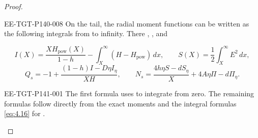\begin{proof}
\begin{EESegment}{EE-TGT-P140-008}
On the tail, the radial moment functions can be written as the following integrals from
 to infinity. There ,
, and
\end{EESegment}
\[
  I(X)=\frac{XH_{\mathrm{pow}}(X)}{1-h}-\int_X^\infty(H-H_{\mathrm{pow}})\,dx,
  \qquad
  S(X)=\frac12\int_X^\infty E^2\,dx,
\]
\[
  Q_s=-1+\frac{(1-h)I-D\eta I_\eta}{XH},
  \qquad
  N_s=\frac{4h\eta S-dS_\eta}{X}+4A\eta\Pi-d\Pi_\eta.
\]

%
\begin{EESegment}{EE-TGT-P141-001}
The first formula uses  to integrate
 from zero. The remaining formulas follow directly from the exact moments and
the integral formulas \eqref{eq:4.16} for .
\end{EESegment}


\end{proof}
